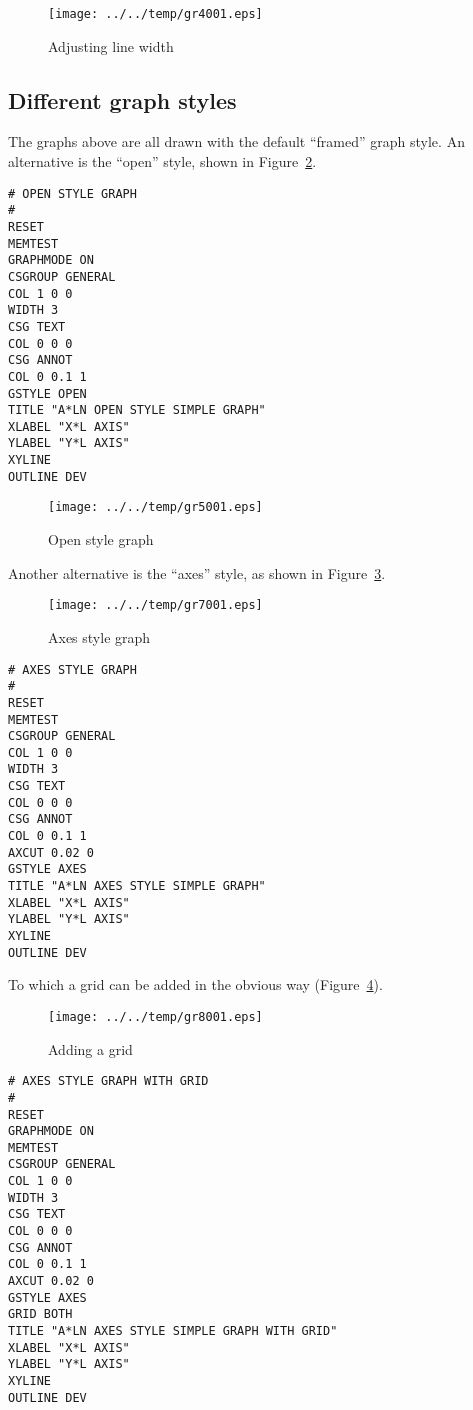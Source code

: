 \documentclass[a4paper,twoside,11pt]{article}
\makeatletter
\def\maxwidth{%
  \ifdim\Gin@nat@width>\linewidth
    \linewidth
  \else
    \Gin@nat@width
  \fi
}
\newcommand{\newpara}{\par\vspace{4mm}\noindent}
\makeatother
\begin{document}
\begin{figure}
  \centering
  \texttt{[image: ../../temp/gr4001.eps]}
  \caption{Adjusting line width}
  \label{fig:gr4001}
\end{figure}

\subsection{Different graph styles}\label{different-graph-styles}
\newpara
The graphs above are all drawn with the default ``framed'' graph style.
An alternative is the ``open'' style, shown in Figure~\ref{fig:gr5001}.

\begin{lstlisting}
# OPEN STYLE GRAPH
#
RESET
MEMTEST
GRAPHMODE ON
CSGROUP GENERAL
COL 1 0 0
WIDTH 3
CSG TEXT
COL 0 0 0
CSG ANNOT
COL 0 0.1 1
GSTYLE OPEN
TITLE "A*LN OPEN STYLE SIMPLE GRAPH"
XLABEL "X*L AXIS"
YLABEL "Y*L AXIS"
XYLINE
OUTLINE DEV
\end{lstlisting}

\begin{figure}
  \centering
  \texttt{[image: ../../temp/gr5001.eps]}
  \caption{Open style graph}
  \label{fig:gr5001}
\end{figure}

\newpara
Another alternative is the ``axes'' style, as shown in Figure~\ref{fig:gr7001}.

\begin{figure}
  \centering
  \texttt{[image: ../../temp/gr7001.eps]}
  \caption{Axes style graph}
  \label{fig:gr7001}
\end{figure}

\begin{lstlisting}
# AXES STYLE GRAPH
#
RESET
MEMTEST
CSGROUP GENERAL
COL 1 0 0
WIDTH 3
CSG TEXT
COL 0 0 0
CSG ANNOT
COL 0 0.1 1
AXCUT 0.02 0
GSTYLE AXES
TITLE "A*LN AXES STYLE SIMPLE GRAPH"
XLABEL "X*L AXIS"
YLABEL "Y*L AXIS"
XYLINE
OUTLINE DEV
\end{lstlisting}

\newpara
To which a grid can be added in the obvious way (Figure~\ref{fig:gr8001}).

\begin{figure}
  \centering
  \texttt{[image: ../../temp/gr8001.eps]}
  \caption{Adding a grid}
  \label{fig:gr8001}
\end{figure}

\begin{lstlisting}
# AXES STYLE GRAPH WITH GRID
#
RESET
GRAPHMODE ON
MEMTEST
CSGROUP GENERAL
COL 1 0 0
WIDTH 3
CSG TEXT
COL 0 0 0
CSG ANNOT
COL 0 0.1 1
AXCUT 0.02 0
GSTYLE AXES
GRID BOTH
TITLE "A*LN AXES STYLE SIMPLE GRAPH WITH GRID"
XLABEL "X*L AXIS"
YLABEL "Y*L AXIS"
XYLINE
OUTLINE DEV
\end{lstlisting}
\end{document}
